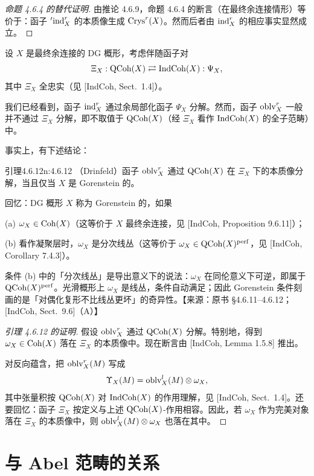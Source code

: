 \begin{proof}[命题 4.6.4 的替代证明]
由推论 4.6.9，命题 4.6.4 的断言（在最终余连接情形）等价于：函子 ${}'\mathrm{ind}^r_X$ 的本质像生成 $\mathrm{Crys}^r(X)$。然而后者由 $\mathrm{ind}^r_X$ 的相应事实显然成立。
\end{proof}

设 $X$ 是最终余连接的 DG 概形，考虑伴随函子对
\[
\Xi_X:\mathrm{QCoh}(X)\rightleftarrows\mathrm{IndCoh}(X):\Psi_X,
\]
其中 $\Xi_X$ 全忠实（见 [IndCoh, Sect.~1.4]）。

我们已经看到，函子 $\mathrm{ind}^r_X$ 通过余局部化函子 $\Psi_X$ 分解。然而，函子 $\mathrm{oblv}^r_X$ 一般并不通过 $\Xi_X$ 分解，即不取值于 $\mathrm{QCoh}(X)$（经 $\Xi_X$ 看作 $\mathrm{IndCoh}(X)$ 的全子范畴）中。

事实上，有下述结论：

\begin{othm}{引理}{4.6.12}{n:4.6.12}
（Drinfeld）函子 $\mathrm{oblv}^r_X$ 通过 $\mathrm{QCoh}(X)$ 在 $\Xi_X$ 下的本质像分解，当且仅当 $X$ 是 Gorenstein 的。
\end{othm}

回忆：DG 概形 $X$ 称为 Gorenstein 的，如果

(a) $\omega_X\in\mathrm{Coh}(X)$（这等价于 $X$ 最终余连接，见 [IndCoh, Proposition 9.6.11]）；

(b) 看作凝聚层时，$\omega_X$ 是分次线丛（这等价于 $\omega_X\in\mathrm{QCoh}(X)^{\mathrm{perf}}$，见 [IndCoh, Corollary 7.4.3]）。

\begin{annote}
条件 (b) 中的「分次线丛」是导出意义下的说法：$\omega_X$ 在同伦意义下可逆，即属于 $\mathrm{QCoh}(X)^{\mathrm{perf}}$。光滑概形上 $\omega_X$ 是线丛，条件自动满足；因此 Gorenstein 条件刻画的是「对偶化复形不比线丛更坏」的奇异性。\hfill【来源：原书 §4.6.11--4.6.12；[IndCoh, Sect.~9.6]（A）】
\end{annote}


\begin{proof}[引理 4.6.12 的证明]
假设 $\mathrm{oblv}^r_X$ 通过 $\mathrm{QCoh}(X)$ 分解。特别地，得到 $\omega_X\in\mathrm{Coh}(X)$ 落在 $\Xi_X$ 的本质像中。现在断言由 [IndCoh, Lemma 1.5.8] 推出。

对反向蕴含，把 $\mathrm{oblv}^r_X(M)$ 写成
\[
\Upsilon_X(M)=\mathrm{oblv}^l_X(M)\otimes\omega_X,
\]
其中张量积按 $\mathrm{QCoh}(X)$ 对 $\mathrm{IndCoh}(X)$ 的作用理解，见 [IndCoh, Sect.~1.4]。还要回忆：函子 $\Xi_X$ 按定义与上述 $\mathrm{QCoh}(X)$-作用相容。因此，若 $\omega_X$ 作为完美对象落在 $\Xi_X$ 的本质像中，则 $\mathrm{oblv}^l_X(M)\otimes\omega_X$ 也落在其中。
\end{proof}

\section{与 Abel 范畴的关系}

